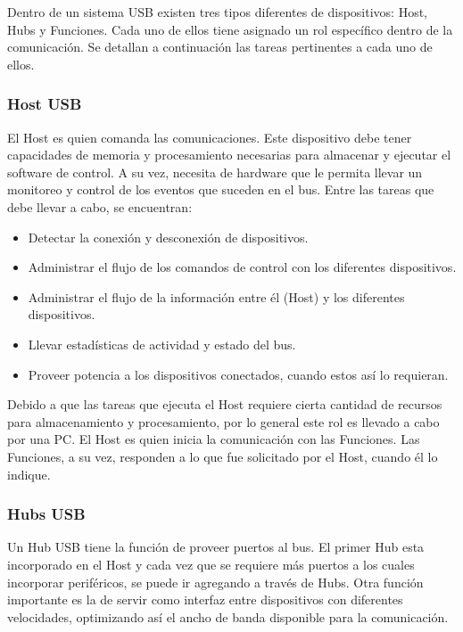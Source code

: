 Dentro de un sistema USB existen tres tipos diferentes de dispositivos: Host, Hubs y Funciones. Cada uno de ellos tiene asignado un rol específico dentro de la comunicación. Se detallan a continuación las tareas pertinentes a cada uno de ellos.

\subsubsection{Host USB}
	El Host es quien comanda las comunicaciones. Este dispositivo debe tener capacidades de memoria y procesamiento necesarias para almacenar y ejecutar el software de control. A su vez, necesita de hardware que le permita llevar un monitoreo y control de los eventos que suceden en el bus. Entre las tareas que debe llevar a cabo, se encuentran:
	
	\begin{itemize}
		\item Detectar la conexión y desconexión de dispositivos.
		\item Administrar el flujo de los comandos de control con los diferentes dispositivos.
		\item Administrar el flujo de la información entre él (Host) y los diferentes dispositivos.
		\item Llevar estadísticas de actividad y estado del bus.
		\item Proveer potencia a los dispositivos conectados, cuando estos así lo requieran.
	\end{itemize}
	
	Debido a que las tareas que ejecuta el Host requiere cierta cantidad de recursos para almacenamiento y procesamiento, por lo general este rol es llevado a cabo por una PC. El Host es quien inicia la comunicación con las Funciones. Las Funciones, a su vez, responden a lo que fue solicitado por el Host, cuando él lo indique.%
	
\subsubsection{Hubs USB}
	Un Hub USB tiene la función de proveer puertos al bus. El primer Hub esta incorporado en el Host y cada vez que se requiere más puertos a los cuales incorporar periféricos, se puede ir agregando a través de Hubs. Otra función importante es la de servir como interfaz entre dispositivos con diferentes velocidades, optimizando así el ancho de banda disponible para la comunicación.%
	
